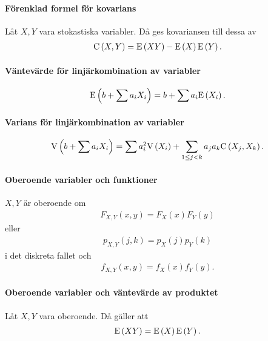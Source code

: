 \paragraph{Förenklad formel för kovarians}
Låt $X, Y$ vara stokastiska variabler. Då ges kovariansen till dessa av
\begin{align*}
	\text{C}\left(X, Y\right) = \text{E}\left(XY\right) - \text{E}\left(X\right)\text{E}\left(Y\right).
\end{align*}

\proof

\paragraph{Väntevärde för linjärkombination av variabler}
\begin{align*}
	\text{E}\left(b + \sum a_iX_i\right) = b +\sum a_i\text{E}\left(X_i\right).
\end{align*}

\proof

\paragraph{Varians för linjärkombination av variabler}
\begin{align*}
	\text{V}\left(b + \sum a_iX_i\right) = \sum a_i^2\text{V}\left(X_i\right) + \sum\limits_{1\leq j < k}a_ja_k\text{C}\left(X_j, X_k\right).
\end{align*}

\paragraph{Oberoende variabler och funktioner}
$X, Y$ är oberoende om
\begin{align*}
	F_{X, Y}(x, y) = F_{X}(x)F_{Y}(y)
\end{align*}
eller
\begin{align*}
	p_{X, Y}(j, k) = p_{X}(j)p_{Y}(k)
\end{align*}
i det diskreta fallet och
\begin{align*}
	f_{X, Y}(x, y) = f_{X}(x)f_{Y}(y).
\end{align*}

\proof

\paragraph{Oberoende variabler och väntevärde av produktet}
Låt $X, Y$ vara oberoende. Då gäller att
\begin{align*}
	\text{E}\left(XY\right) = \text{E}\left(X\right)\text{E}\left(Y\right).
\end{align*}

